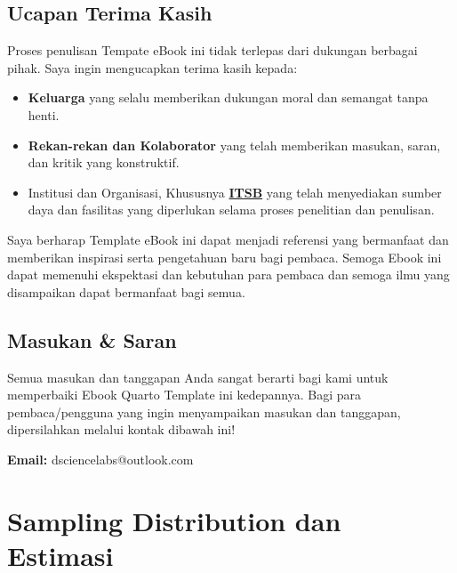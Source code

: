 \documentclass[
  indonesian,
  letterpaper,
]{book}
\providecommand{\tightlist}{%
  \setlength{\itemsep}{0pt}\setlength{\parskip}{0pt}}
\begin{document}
\section*{Ucapan Terima Kasih}\label{ucapan-terima-kasih}


Proses penulisan Tempate eBook ini tidak terlepas dari dukungan berbagai
pihak. Saya ingin mengucapkan terima kasih kepada:

\begin{itemize}
\tightlist
\item
  \textbf{Keluarga} yang selalu memberikan dukungan moral dan semangat
  tanpa henti.
\item
  \textbf{Rekan-rekan dan Kolaborator} yang telah memberikan masukan,
  saran, dan kritik yang konstruktif.
\item
  Institusi dan Organisasi, Khususnya
  \textbf{\href{https://itsb.ac.id/}{ITSB}} yang telah menyediakan
  sumber daya dan fasilitas yang diperlukan selama proses penelitian dan
  penulisan.
\end{itemize}

Saya berharap Template eBook ini dapat menjadi referensi yang bermanfaat
dan memberikan inspirasi serta pengetahuan baru bagi pembaca. Semoga
Ebook ini dapat memenuhi ekspektasi dan kebutuhan para pembaca dan
semoga ilmu yang disampaikan dapat bermanfaat bagi semua.

\section*{Masukan \& Saran}\label{masukan-saran}


Semua masukan dan tanggapan Anda sangat berarti bagi kami untuk
memperbaiki Ebook Quarto Template ini kedepannya. Bagi para
pembaca/pengguna yang ingin menyampaikan masukan dan tanggapan,
dipersilahkan melalui kontak dibawah ini!

\textbf{Email:} dsciencelabs@outlook.com


\chapter{Sampling Distribution dan
Estimasi}\label{sampling-distribution-dan-estimasi}
\end{document}
